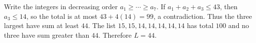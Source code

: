 Write the integers in decreasing order $a_1\ge\cdots\ge a_7$. If $a_1+a_2+a_3\le43$, then $a_3\le14$, so the total is at most $43+4(14)=99$, a contradiction. Thus the three largest have sum at least $44$. The list $15,15,14,14,14,14,14$ has total $100$ and no three have sum greater than $44$. Therefore $\boxed{L=44}$.
